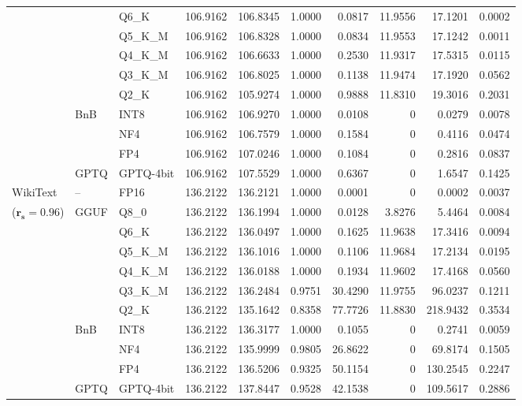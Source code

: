 \begin{longtable}{ll l rrrrrrr}
 &  & Q6\_K & 106.9162 & 106.8345 & 1.0000 & 0.0817 & 11.9556 & 17.1201 & 0.0002 \\
 &  & Q5\_K\_M & 106.9162 & 106.8328 & 1.0000 & 0.0834 & 11.9553 & 17.1242 & 0.0011 \\
 &  & Q4\_K\_M & 106.9162 & 106.6633 & 1.0000 & 0.2530 & 11.9317 & 17.5315 & 0.0115 \\
 &  & Q3\_K\_M & 106.9162 & 106.8025 & 1.0000 & 0.1138 & 11.9474 & 17.1920 & 0.0562 \\
 &  & Q2\_K & 106.9162 & 105.9274 & 1.0000 & 0.9888 & 11.8310 & 19.3016 & 0.2031 \\
 & BnB & INT8 & 106.9162 & 106.9270 & 1.0000 & 0.0108 & \cellcolor{cyan!12} $0$ & 0.0279 & 0.0078 \\
 &  & NF4 & 106.9162 & 106.7579 & 1.0000 & 0.1584 & \cellcolor{cyan!12} $0$ & 0.4116 & 0.0474 \\
 &  & FP4 & 106.9162 & 107.0246 & 1.0000 & 0.1084 & \cellcolor{cyan!12} $0$ & 0.2816 & 0.0837 \\
 & GPTQ & GPTQ-4bit & 106.9162 & 107.5529 & 1.0000 & 0.6367 & \cellcolor{cyan!12} $0$ & 1.6547 & 0.1425 \\
\midrule
WikiText & -- & FP16 & 136.2122 & 136.2121 & 1.0000 & 0.0001 & \cellcolor{cyan!12} $0$ & 0.0002 & 0.0037 \\
{\small ($\mathbf{r_s{=}0.96}$)} & GGUF & Q8\_0 & 136.2122 & 136.1994 & 1.0000 & 0.0128 & 3.8276 & 5.4464 & 0.0084 \\
 &  & Q6\_K & 136.2122 & 136.0497 & 1.0000 & 0.1625 & 11.9638 & 17.3416 & 0.0094 \\
 &  & Q5\_K\_M & 136.2122 & 136.1016 & 1.0000 & 0.1106 & 11.9684 & 17.2134 & 0.0195 \\
 &  & Q4\_K\_M & 136.2122 & 136.0188 & 1.0000 & 0.1934 & 11.9602 & 17.4168 & 0.0560 \\
 &  & Q3\_K\_M & 136.2122 & 136.2484 & 0.9751 & 30.4290 & 11.9755 & 96.0237 & 0.1211 \\
 &  & Q2\_K & 136.2122 & 135.1642 & \cellcolor{red!18} 0.8358 & \cellcolor{red!18} 77.7726 & 11.8830 & \cellcolor{red!18} 218.9432 & \cellcolor{red!18} 0.3534 \\
 & BnB & INT8 & 136.2122 & 136.3177 & 1.0000 & 0.1055 & \cellcolor{cyan!12} $0$ & 0.2741 & 0.0059 \\
 &  & NF4 & 136.2122 & 135.9999 & 0.9805 & 26.8622 & \cellcolor{cyan!12} $0$ & 69.8174 & 0.1505 \\
 &  & FP4 & 136.2122 & 136.5206 & \cellcolor{red!18} 0.9325 & \cellcolor{red!18} 50.1154 & \cellcolor{cyan!12} $0$ & \cellcolor{red!18} 130.2545 & \cellcolor{red!18} 0.2247 \\
 & GPTQ & GPTQ-4bit & 136.2122 & 137.8447 & 0.9528 & 42.1538 & \cellcolor{cyan!12} $0$ & 109.5617 & 0.2886 \\
\end{longtable}
\endgroup